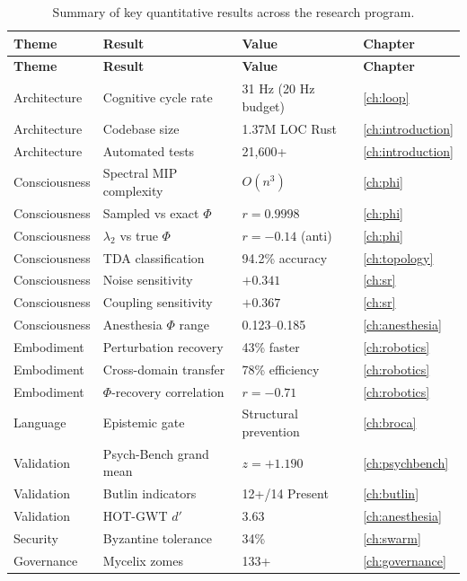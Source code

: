 \documentclass[12pt]{book}
\begin{document}
\begin{longtable}{p{3.5cm}p{4cm}p{3.5cm}l}
\caption{Summary of key quantitative results across the research program.}
\label{tab:key-results} \\
\toprule
\textbf{Theme} & \textbf{Result} & \textbf{Value} & \textbf{Chapter} \\
\midrule
\endfirsthead
\toprule
\textbf{Theme} & \textbf{Result} & \textbf{Value} & \textbf{Chapter} \\
\midrule
\endhead
Architecture & Cognitive cycle rate & 31 Hz (20 Hz budget) & \ref{ch:loop} \\
Architecture & Codebase size & 1.37M LOC Rust & \ref{ch:introduction} \\
Architecture & Automated tests & 21,600+ & \ref{ch:introduction} \\
Consciousness & Spectral MIP complexity & $O(n^3)$ & \ref{ch:phi} \\
Consciousness & Sampled vs exact $\Phi$ & $r = 0.9998$ & \ref{ch:phi} \\
Consciousness & $\lambda_2$ vs true $\Phi$ & $r = -0.14$ (anti) & \ref{ch:phi} \\
Consciousness & TDA classification & 94.2\% accuracy & \ref{ch:topology} \\
Consciousness & Noise sensitivity & $+0.341$ & \ref{ch:sr} \\
Consciousness & Coupling sensitivity & $+0.367$ & \ref{ch:sr} \\
Consciousness & Anesthesia $\Phi$ range & 0.123--0.185 & \ref{ch:anesthesia} \\
Embodiment & Perturbation recovery & 43\% faster & \ref{ch:robotics} \\
Embodiment & Cross-domain transfer & 78\% efficiency & \ref{ch:robotics} \\
Embodiment & $\Phi$-recovery correlation & $r = -0.71$ & \ref{ch:robotics} \\
Language & Epistemic gate & Structural prevention & \ref{ch:broca} \\
Validation & Psych-Bench grand mean & $z = +1.190$ & \ref{ch:psychbench} \\
Validation & Butlin indicators & 12+/14 Present & \ref{ch:butlin} \\
Validation & HOT-GWT $d'$ & 3.63 & \ref{ch:anesthesia} \\
Security & Byzantine tolerance & 34\% & \ref{ch:swarm} \\
Governance & Mycelix zomes & 133+ & \ref{ch:governance} \\

\end{longtable}
\end{document}
